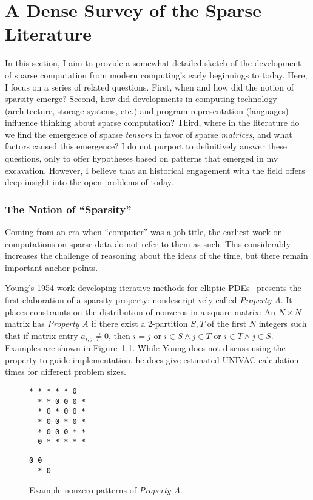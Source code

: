 
\chapter{A Dense Survey of the Sparse Literature}


In this section, I aim to provide a somewhat detailed sketch of the development of sparse computation from modern computing's early beginnings to today.
Here, I focus on a series of related questions.
First, when and how did the notion of sparsity emerge?
Second, how did developments in computing technology (architecture, storage systems, etc.) and program representation (languages) influence thinking about sparse computation?
Third, where in the literature do we find the emergence of sparse \textit{tensors} in favor of sparse \textit{matrices}, and what factors caused this emergence? 
I do not purport to definitively answer these questions, only to offer hypotheses based on patterns that emerged in my excavation.
However, I believe that an historical engagement with the field offers deep insight into the open problems of today.

\subsection{The Notion of \enquote{Sparsity}}

Coming from an era when \enquote{computer} was a job title, the earliest work on computations on sparse data do not refer to them as such. 
This considerably increases the challenge of reasoning about the ideas of the time, but there remain important anchor points. 

Young's 1954 work developing iterative methods for elliptic PDEs~\cite{young1954iterative} presents the first elaboration of a sparsity property: nondescriptively called \textit{Property A}.
It places constraints on the distribution of nonzeros in a square matrix: An $N \times N$ matrix has \textit{Property A} if there exist a 2-partition $S,T$ of the first $N$ integers such that if matrix entry $a_{i,j} \neq 0$, then $i=j$ or $i \in S \land j \in T$ or $i \in T \land j \in S$. 
Examples are shown in Figure~\ref{propAExamples}.
While Young does not discuss using the property to guide implementation, he does give estimated UNIVAC calculation times for different problem sizes.
\begin{figure}[h]
\begin{lstlisting}[caption={Entry pattern for $N=6,T=\{0,5\},S=\{1,2,3,4\}$ maximal \textit{Property A} matrix}]
  * * * * * 0
  * * 0 0 0 *
  * 0 * 0 0 *
  * 0 0 * 0 *
  * 0 0 0 * *
  0 * * * * *
\end{lstlisting}
\begin{lstlisting}[caption={Entry pattern for one $N=2,T=\{0\},S=\{1\}$ \textit{Property A} matrix},label={propAnonSym}]
  0 0
  * 0
\end{lstlisting}
\caption{Example nonzero patterns of \textit{Property A}. }
\label{propAExamples}
\end{figure}

